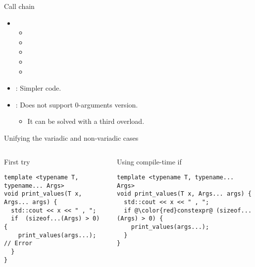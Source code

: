 \begin{frame}[t,fragile]{Call chain}
\begin{itemize}
  \item {}
    \begin{itemize}
      \item \pause {}
      \item \pause {}
      \item \pause {}
      \item \pause {}
      \item \pause {}
    \end{itemize}

  \item {}: Simpler code.

  \item {}: Does not support 0-arguments version.
    \begin{itemize}
      \item It can be solved with a third overload.
    \end{itemize}
\end{itemize}
\end{frame}

\begin{frame}[t,fragile]{Unifying the variadic and non-variadic cases}

\begin{columns}[T]

\pause
{}
\begin{block}{First try}
\begin{lstlisting}
template <typename T, typename... Args>
void print_values(T x, Args... args) {
  std::cout << x << " , ";
  if  (sizeof...(Args) > 0) { 
    print_values(args...); // Error
  }
}
\end{lstlisting}
\end{block}

\pause
{}
\begin{block}{Using compile-time if}
\begin{lstlisting}[escapechar=@]
template <typename T, typename... Args>
void print_values(T x, Args... args) {
  std::cout << x << " , ";
  if @\color{red}constexpr@ (sizeof...(Args) > 0) { 
    print_values(args...); 
  }
}
\end{lstlisting}
\end{block}
\end{columns}
\end{frame}
